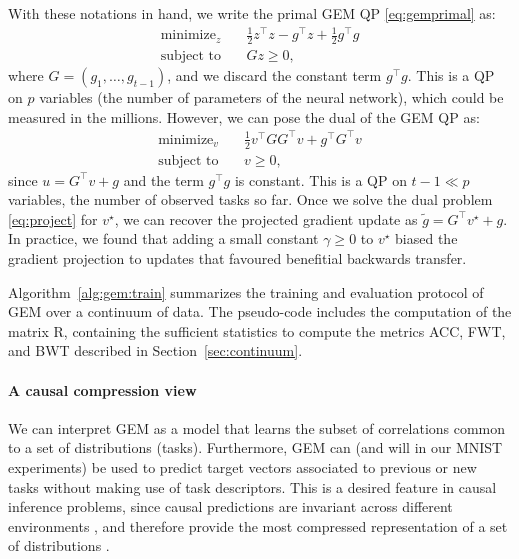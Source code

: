 \documentclass{article}
\begin{document}
With these notations in hand, we write the primal GEM QP \eqref{eq:gemprimal} as:
\begin{align*}
    \text{minimize}_z   \quad& \frac{1}{2} z^\top z -g^\top z + \frac{1}{2} g^\top g\\
    \text{subject to}   \quad& Gz \geq 0,
\end{align*}
where $G = (g_1, \ldots, g_{t-1})$, and we discard the constant term $g^\top g$.
This is a QP on $p$ variables (the number of parameters of the neural
network), which could be measured in the millions. However, we can pose the
dual of the GEM QP as: 
\begin{align}
    \text{minimize}_{v}   \quad&\frac{1}{2} v^\top GG^\top v + g^\top G^\top v\nonumber\\
    \text{subject to} \quad&v \geq 0,\label{eq:project}
\end{align}
since $u = G^\top v + g$ and the term $g^\top g$ is constant.  This is a QP on
$t-1 \ll p$ variables, the number of observed tasks so far. Once we solve the
dual problem \eqref{eq:project} for $v^\star$, we can recover the projected
gradient update as $\tilde{g} = G^\top v^\star  + g$.  In practice, we found
that adding a small constant $\gamma \geq 0$ to $v^\star$ biased the gradient
projection to updates that favoured benefitial backwards transfer.

Algorithm~\ref{alg:gem:train} summarizes the training and evaluation protocol
of GEM over a continuum of data. The pseudo-code includes the computation of
the matrix R, containing the sufficient statistics to compute the metrics ACC,
FWT, and BWT described in Section~\ref{sec:continuum}.

\paragraph{A causal compression view} We can interpret GEM as a model that
learns the subset of correlations common to a set of distributions (tasks).
Furthermore, GEM can (and will in our MNIST experiments) be used to predict
target vectors associated to previous or new tasks without making use of task
descriptors. This is a desired feature in causal inference problems, since
causal predictions are invariant across different environments \citep{icp}, and
therefore provide the most compressed representation of a set of distributions
\citep{causal_compression}.
 
\end{document}
